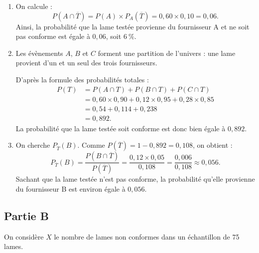 \begin{enumerate}
	\item On calcule :
	\[
	P\left(A\cap\overline T\right)=P(A)\times P_A(\overline T)=0,60\times 0,10=0,06.
	\]
	Ainsi, la probabilité que la lame testée provienne du fournisseur A et ne soit pas conforme est égale à $0,06$, soit $6~\%$.

	\item Les évènements $A$, $B$ et $C$ forment une partition de l'univers : une lame provient d'un et un seul des trois fournisseurs.

	D'après la formule des probabilités totales :
	\[
	\begin{aligned}
	P(T)&=P(A\cap T)+P(B\cap T)+P(C\cap T)\\
	&=0,60\times 0,90+0,12\times 0,95+0,28\times 0,85\\
	&=0,54+0,114+0,238\\
	&=0,892.
	\end{aligned}
	\]
	La probabilité que la lame testée soit conforme est donc bien égale à $0,892$.

	\item On cherche $P_{\overline T}(B)$.
	Comme $P(\overline T)=1-0,892=0,108$, on obtient :
	\[
	P_{\overline T}(B)=\dfrac{P(B\cap\overline T)}{P(\overline T)}
	=\dfrac{0,12\times 0,05}{0,108}
	=\dfrac{0,006}{0,108}
	\approx 0,056.
	\]
	Sachant que la lame testée n'est pas conforme, la probabilité qu'elle provienne du fournisseur B est environ égale à $0,056$.
\end{enumerate}

\subsection*{Partie B}

On considère $X$ le nombre de lames non conformes dans un échantillon de 75 lames.

